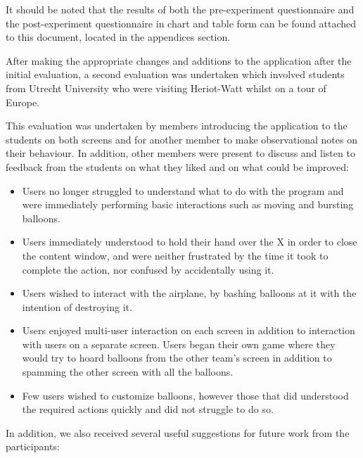It should be noted that the results of both the pre-experiment questionnaire and the post-experiment questionnaire in chart and table form can be found attached to this document, located in the appendices section.


After making the appropriate changes and additions to the application after the initial evaluation, a second evaluation was undertaken which involved students from Utrecht University who were visiting Heriot-Watt whilst on a tour of Europe.

This evaluation was undertaken by members introducing the application to the students on both screens and for another member to make observational notes on their behaviour. In addition, other members were present to discuss and listen to feedback from the students on what they liked and on what could be improved:

\begin{itemize}
	\item Users no longer struggled to understand what to do with the program and were immediately performing basic interactions such as moving and bursting balloons.
	\item Users immediately understood to hold their hand over the X in order to close the content window, and were neither frustrated by the time it took to complete the action, nor confused by accidentally using it.
	\item Users wished to interact with the airplane, by bashing balloons at it with the intention of destroying it.
	\item Users enjoyed multi-user interaction on each screen in addition to interaction with users on a separate screen. Users began their own game where they would try to hoard balloons from the other team's screen in addition to spamming the other screen with all the balloons.
	\item Few users wished to customize balloons, however those that did understood the required actions quickly and did not struggle to do so.
\end{itemize}

In addition, we also received several useful suggestions for future work from the participants:

